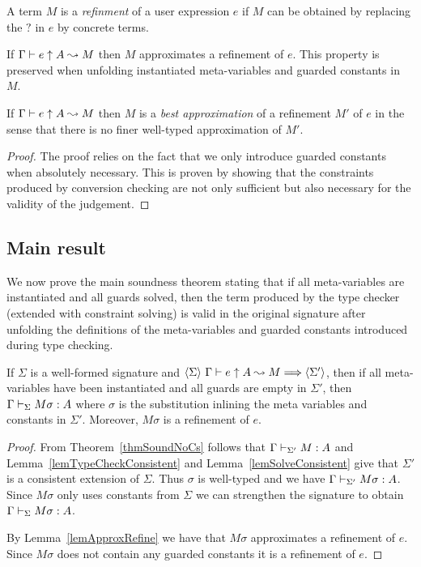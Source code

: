 \begin{definition}[Refinement]
    A term $M$ is a {\em refinment} of a user expression $e$ if $M$ can be
    obtained by replacing the $?$ in $e$ by concrete terms.
\end{definition}

\begin{lemma} \label{lemApproxRefine}
    If ${\Gamma} \vdash {e} \uparrow {A} \leadsto {M}$ then $M$ approximates a refinement of $e$. This
    property is preserved when unfolding instantiated meta-variables and
    guarded constants in $M$.
\end{lemma}

\begin{lemma}
    If ${\Gamma} \vdash {e} \uparrow {A} \leadsto {M}$ then $M$ is a {\em best approximation} of a
    refinement $M'$ of $e$ in the sense that there is no finer well-typed
    approximation of $M'$.
\end{lemma}

\begin{proof}
The proof relies on the fact that we only introduce guarded constants when
absolutely necessary. This is proven by showing that the constraints produced
by conversion checking are not only sufficient but also necessary for the
validity of the judgement.
\end{proof}

\subsection{Main result}

We now prove the main soundness theorem stating that if all meta-variables are
instantiated and all guards solved, then the term produced by the type checker
(extended with constraint solving) is valid in the original signature after
unfolding the definitions of the meta-variables and guarded constants
introduced during type checking.

\begin{theorem} \label{thmMain}
    If $\Sigma$ is a well-formed {\Core} signature and $\langle {\Sigma} \rangle ~ {{\Gamma} \vdash {e} \uparrow {A} \leadsto {M}} \Longrightarrow \langle {\Sigma'} \rangle$, then if all meta-variables have been
    instantiated and all guards are empty in $\Sigma'$, then ${\Gamma} \vdash_{\Sigma} {M\sigma} : {A}$ where $\sigma$ is the substitution inlining the meta
    variables and constants in $\Sigma'$. Moreover, $M\sigma$ is a refinement
    of $e$.
\end{theorem}

\begin{proof}
    From Theorem~\ref{thmSoundNoCs} follows that ${\Gamma} \vdash_{\Sigma'} {M} : {A}$ and Lemma~\ref{lemTypeCheckConsistent} and
    Lemma~\ref{lemSolveConsistent} give that $\Sigma'$ is a consistent
    extension of $\Sigma$.  Thus $\sigma$ is well-typed and we have ${\Gamma} \vdash_{\Sigma'} {M\sigma} : {A}$.
    Since $M\sigma$ only uses constants from $\Sigma$ we can strengthen the
    signature to obtain ${\Gamma} \vdash_{\Sigma} {M\sigma} : {A}$.

    By Lemma~\ref{lemApproxRefine} we have that $M\sigma$ approximates a
    refinement of $e$. Since $M\sigma$ does not contain any guarded constants
    it is a refinement of $e$.
\end{proof}

